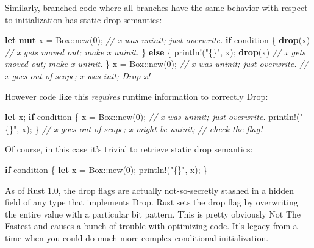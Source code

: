\documentclass[a4paper,]{book}
\newenvironment{Shaded}{\begin{snugshade}}{\end{snugshade}}
\newcommand{\KeywordTok}[1]{\textcolor[rgb]{0.13,0.29,0.53}{\textbf{{#1}}}}
\newcommand{\DecValTok}[1]{\textcolor[rgb]{0.00,0.00,0.81}{{#1}}}
\newcommand{\StringTok}[1]{\textcolor[rgb]{0.31,0.60,0.02}{{#1}}}
\newcommand{\CommentTok}[1]{\textcolor[rgb]{0.56,0.35,0.01}{\textit{{#1}}}}
\newcommand{\OtherTok}[1]{\textcolor[rgb]{0.56,0.35,0.01}{{#1}}}
\newcommand{\NormalTok}[1]{{#1}}
\begin{document}
Similarly, branched code where all branches have the same behavior with
respect to initialization has static drop semantics:

\begin{Shaded}
\begin{Highlighting}[]
\KeywordTok{let} \KeywordTok{mut} \NormalTok{x = Box::new(}\DecValTok{0}\NormalTok{);    }\CommentTok{// x was uninit; just overwrite.}
\KeywordTok{if} \NormalTok{condition \{}
    \KeywordTok{drop}\NormalTok{(x)                 }\CommentTok{// x gets moved out; make x uninit.}
\NormalTok{\} }\KeywordTok{else} \NormalTok{\{}
    \OtherTok{println!}\NormalTok{(}\StringTok{"\{\}"}\NormalTok{, x);}
    \KeywordTok{drop}\NormalTok{(x)                 }\CommentTok{// x gets moved out; make x uninit.}
\NormalTok{\}}
\NormalTok{x = Box::new(}\DecValTok{0}\NormalTok{);            }\CommentTok{// x was uninit; just overwrite.}
                            \CommentTok{// x goes out of scope; x was init; Drop x!}
\end{Highlighting}
\end{Shaded}

However code like this \emph{requires} runtime information to correctly
Drop:

\begin{Shaded}
\begin{Highlighting}[]
\KeywordTok{let} \NormalTok{x;}
\KeywordTok{if} \NormalTok{condition \{}
    \NormalTok{x = Box::new(}\DecValTok{0}\NormalTok{);        }\CommentTok{// x was uninit; just overwrite.}
    \OtherTok{println!}\NormalTok{(}\StringTok{"\{\}"}\NormalTok{, x);}
\NormalTok{\}}
                            \CommentTok{// x goes out of scope; x might be uninit;}
                            \CommentTok{// check the flag!}
\end{Highlighting}
\end{Shaded}

Of course, in this case it's trivial to retrieve static drop semantics:

\begin{Shaded}
\begin{Highlighting}[]
\KeywordTok{if} \NormalTok{condition \{}
    \KeywordTok{let} \NormalTok{x = Box::new(}\DecValTok{0}\NormalTok{);}
    \OtherTok{println!}\NormalTok{(}\StringTok{"\{\}"}\NormalTok{, x);}
\NormalTok{\}}
\end{Highlighting}
\end{Shaded}

As of Rust 1.0, the drop flags are actually not-so-secretly stashed in a
hidden field of any type that implements Drop. Rust sets the drop flag
by overwriting the entire value with a particular bit pattern. This is
pretty obviously Not The Fastest and causes a bunch of trouble with
optimizing code. It's legacy from a time when you could do much more
complex conditional initialization.
\end{document}
